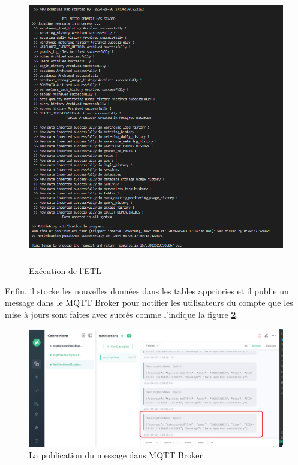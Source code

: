 \begin{figure}[H]
    \centering
    \includegraphics[width =1\linewidth ,height=12cm]{img/captures/etl/results.PNG}
    \caption{Exécution de l'ETL}
        \label{fig:result}
\end{figure}
\par Enfin, il stocke les nouvelles données dans les tables appriories et il publie un message dans le MQTT Broker pour notifier les utilisateurs du compte que les mise à jours sont faites avec succés comme l'indique la figure \textbf{\ref{fig:mqtt}}.

\begin{figure}[H]
    \centering
    \includegraphics[width =1\linewidth]{img/captures/etl/mqtt.PNG}
    \caption{La publication du message dans MQTT Broker}
        \label{fig:mqtt}
\end{figure}

